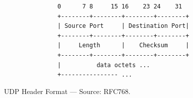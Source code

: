 \documentclass[pdftex,12pt,a4paper]{article}
\begin{document}
        \begin{figure}[tbh]
                    \begin{center}
                    \begin{verbatim}
               0      7 8     15 16    23 24    31
               +--------+--------+--------+--------+
               | Source Port     | Destination Port|
               +--------+--------+--------+--------+
               |     Length      |    Checksum     |
               +--------+--------+--------+--------+
               |          data octets ...
               +---------------- ...\end{verbatim}
            \end{center}
            \vspace{-15pt}
            \caption{UDP Header Format --- Source: RFC768.}
            \label{fig:udp}
            \vspace{10pt}
        \end{figure}
\end{document}
